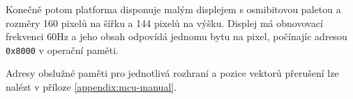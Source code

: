 Konečně potom platforma disponuje malým displejem s osmibitovou paletou a rozměry 160 pixelů na šířku a 144 pixelů na výšku. Displej má obnovovací frekvenci 60Hz a jeho obsah odpovídá jednomu bytu na pixel, počínajíc adresou \texttt{0x8000} v operační paměti.

Adresy obslužné paměti pro jednotlivá rozhraní a pozice vektorů přerušení lze nalézt v příloze \ref{appendix:mcu-manual}.
